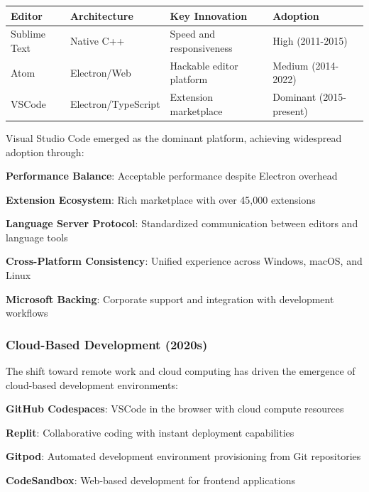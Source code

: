 \begin{center}
\begin{tabular}{@{}llll@{}}
\toprule
\textbf{Editor} & \textbf{Architecture} & \textbf{Key Innovation} & \textbf{Adoption} \\
\midrule
Sublime Text & Native C++ & Speed and responsiveness & High (2011-2015) \\
Atom & Electron/Web & Hackable editor platform & Medium (2014-2022) \\
VSCode & Electron/TypeScript & Extension marketplace & Dominant (2015-present) \\
\bottomrule
\end{tabular}
\end{center}

Visual Studio Code emerged as the dominant platform, achieving widespread adoption through:

\begin{expandedlist}
    \item \textbf{Performance Balance}: Acceptable performance despite Electron overhead
    \item \textbf{Extension Ecosystem}: Rich marketplace with over 45,000 extensions
    \item \textbf{Language Server Protocol}: Standardized communication between editors and language tools
    \item \textbf{Cross-Platform Consistency}: Unified experience across Windows, macOS, and Linux
    \item \textbf{Microsoft Backing}: Corporate support and integration with development workflows
\end{expandedlist}

\subsubsection{Cloud-Based Development (2020s)}

The shift toward remote work and cloud computing has driven the emergence of cloud-based development environments:

\begin{compactlist}
    \item \textbf{GitHub Codespaces}: VSCode in the browser with cloud compute resources
    \item \textbf{Replit}: Collaborative coding with instant deployment capabilities
    \item \textbf{Gitpod}: Automated development environment provisioning from Git repositories
    \item \textbf{CodeSandbox}: Web-based development for frontend applications
\end{compactlist}

